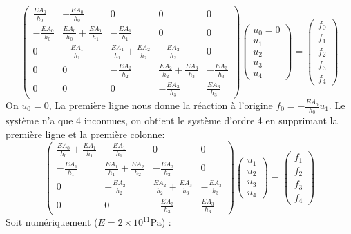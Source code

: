 \documentclass[a4paper]{article}
\begin{document}
\[\left(\begin{array}{ccccc} 
\frac{EA_0}{h_0}&-\frac{EA_0}{h_0}&0&0&0\\-\frac{EA_0}{h_0}&\frac{EA_0}{h_0}+\frac{EA_1}{h_1}&-\frac{EA_1}{h_1}&0&0\\
0&-\frac{EA_1}{h_1}&\frac{EA_1}{h_1}+\frac{EA_2}{h_2}&-\frac{EA_2}{h_2}&0\\0&0&-\frac{EA_2}{h_2}&\frac{EA_2}{h_2}+\frac{EA_3}{h_3}&-\frac{EA_3}{h_3}\\
0&0&0&-\frac{EA_3}{h_3}&\frac{EA_3}{h_3}
\end{array}\right) \left(\begin{array}{l} 
u _{0}=0\\u _{1}\\u _{2}\\u _{3}\\u _{4}
\end{array}\right)=\left(\begin{array}{c} 
f_{0}\\f_{1}\\f_{2}\\f_{3}\\f_{4}
\end{array}\right)
\]
On $u _0=0$, La première ligne nous donne la réaction à l'origine $f_0=-\frac{EA_0}{h_0}u _1$. Le système n'a que 4 inconnues, on obtient le système d'ordre 4 en supprimant la première ligne et la première colonne:
\[\left(\begin{array}{cccc} 
\frac{EA_0}{h_0}+\frac{EA_1}{h_1}&-\frac{EA_1}{h_1}&0&0\\
-\frac{EA_1}{h_1}&\frac{EA_1}{h_1}+\frac{EA_2}{h_2}&-\frac{EA_2}{h_2}&0\\
0&-\frac{EA_2}{h_2}&\frac{EA_2}{h_2}+\frac{EA_3}{h_3}&-\frac{EA_3}{h_3}\\
0&0&-\frac{EA_3}{h_3}&\frac{EA_3}{h_3}
\end{array}\right) \left(\begin{array}{l} 
u _{1}\\u _{2}\\u _{3}\\u _{4}
\end{array}\right)=\left(\begin{array}{c} 
f_{1}\\f_{2}\\f_{3}\\f_{4}
\end{array}\right)
\]
Soit numériquement ($E=2\times 10^{11}$Pa) :
\end{document}
